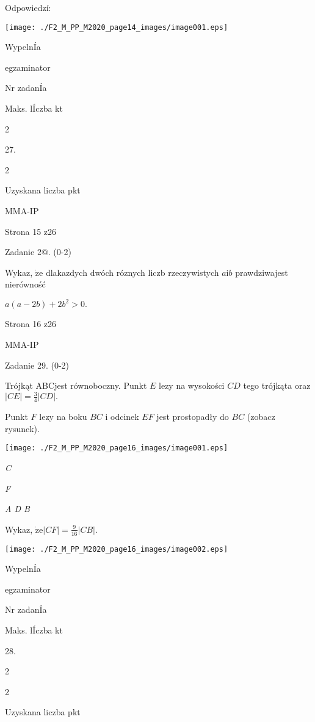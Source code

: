 \documentclass[a4paper,12pt]{article}
\begin{document}
Odpowiedzí:
\begin{center}
\texttt{[image: ./F2\_M\_PP\_M2020\_page14\_images/image001.eps]}
\end{center}
WypelnÍa

egzaminator

Nr zadanÍa

Maks. lÍczba kt

2

27.

2

Uzyskana liczba pkt

MMA-IP

Strona 15 z26





Zadanie 2@. (0-2)

Wykaz, $\dot{\mathrm{z}}\mathrm{e}$ dlakazdych dwóch róznych liczb rzeczywistych $a\mathrm{i}b$ prawdziwajest nierówność

$a(a-2b)+2b^{2}>0.$

Strona 16 z26

MMA-IP





Zadanie 29. (0-2)

Trójkąt ABCjest równoboczny. Punkt $E$ lezy na wysokości $CD$ tego trójkąta oraz $|CE|=\displaystyle \frac{3}{4}|CD|.$

Punkt $F$ lezy na boku $BC$ i odcinek $EF$ jest prostopadły do $BC$ (zobacz rysunek).
\begin{center}
\texttt{[image: ./F2\_M\_PP\_M2020\_page16\_images/image001.eps]}
\end{center}
{\it C}

{\it F}

{\it A  D  B}

Wykaz, $\displaystyle \dot{\mathrm{z}}\mathrm{e}|CF|=\frac{9}{16}|CB|.$
\begin{center}
\texttt{[image: ./F2\_M\_PP\_M2020\_page16\_images/image002.eps]}
\end{center}
WypelnÍa

egzaminator

Nr zadanÍa

Maks. lÍczba kt

28.

2

2

Uzyskana liczba pkt
\end{document}
